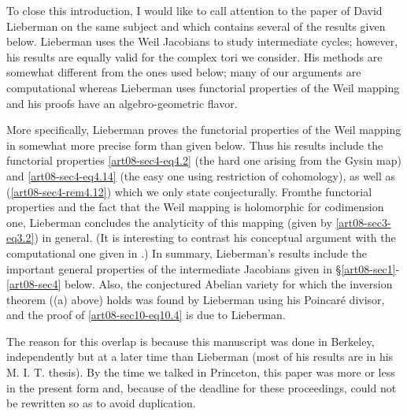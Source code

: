 To close this introduction, I would like to call attention to the paper of David Lieberman \cite{art08-key20} on the same subject and which contains several of the results given below. Lieberman uses the Weil Jacobians \cite{art08-key22} to study intermediate cycles; however, his results are equally valid for the complex tori we consider. His methods are somewhat different from the ones used below; many of our arguments are computational whereas Lieberman uses functorial properties of the Weil mapping and his proofs have an algebro-geometric flavor.

More specifically, Lieberman proves the functorial properties of the Weil mapping in somewhat more precise form than given below. Thus his results include the functorial properties \eqref{art08-sec4-eq4.2} (the hard one arising from the Gysin map) and \eqref{art08-sec4-eq4.14} (the easy one using restriction of cohomology), as well as (\ref{art08-sec4-rem4.12}) which we only state conjecturally. From\pageoriginale the functorial properties and the fact that the Weil mapping is holomorphic for codimension one, Lieberman concludes the analyticity of this mapping (given by \eqref{art08-sec3-eq3.2}) in general. (It is interesting to contrast his conceptual argument with the computational one given in \cite{art08-key9}.) In summary, Lieberman's results include the important general properties of the intermediate Jacobians given in \S\ref{art08-sec1}-\ref{art08-sec4} below. Also, the conjectured Abelian variety for which the inversion theorem ((a) above) holds was found by Lieberman using his Poincar\'e divisor, and the proof of \eqref{art08-sec10-eq10.4} is due to Lieberman.

The reason for this overlap is because this manuscript was done in Berkeley, independently but at a later time than Lieberman (most of his results are in his M. I. T. thesis). By the time we talked in Princeton, this paper was more or less in the present form and, because of the deadline for these proceedings, could not be rewritten so as to avoid duplication.



